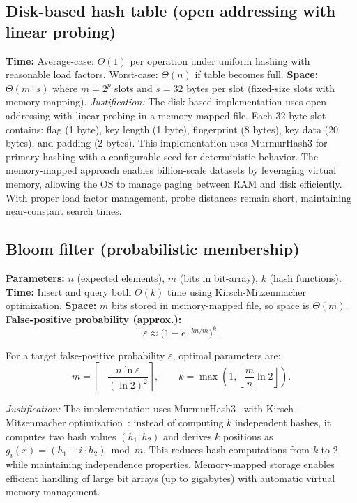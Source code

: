 \documentclass[sigconf]{acmart}
\begin{document}
\subsection{Disk-based hash table (open addressing with linear probing)}
\textbf{Time:} Average-case: $\Theta(1)$ per operation under uniform hashing with reasonable load factors. Worst-case: $\Theta(n)$ if table becomes full.\newline
\textbf{Space:} $\Theta(m \cdot s)$ where $m = 2^p$ slots and $s = 32$ bytes per slot (fixed-size slots with memory mapping).\newline
\textit{Justification:} The disk-based implementation uses open addressing with linear probing in a memory-mapped file. Each 32-byte slot contains: flag (1 byte), key length (1 byte), fingerprint (8 bytes), key data (20 bytes), and padding (2 bytes). This implementation uses MurmurHash3 for primary hashing with a configurable seed for deterministic behavior. The memory-mapped approach enables billion-scale datasets by leveraging virtual memory, allowing the OS to manage paging between RAM and disk efficiently. With proper load factor management, probe distances remain short, maintaining near-constant search times.

\subsection{Bloom filter (probabilistic membership)}
\textbf{Parameters:} $n$ (expected elements), $m$ (bits in bit-array), $k$ (hash functions).\newline
\textbf{Time:} Insert and query both $\Theta(k)$ time using Kirsch-Mitzenmacher optimization.\newline
\textbf{Space:} $m$ bits stored in memory-mapped file, so space is $\Theta(m)$.\newline
\textbf{False-positive probability (approx.):}
\[
\varepsilon \approx \bigl(1 - e^{-kn/m}\bigr)^k.
\]

For a target false-positive probability \(\varepsilon\), optimal parameters are:
\[
m = \left\lceil -\dfrac{n \ln \varepsilon}{(\ln 2)^2} \right\rceil, \qquad
k = \max\left(1, \left\lfloor \dfrac{m}{n}\ln 2 \right\rfloor\right).
\]

\textit{Justification:} The implementation uses MurmurHash3~\cite{mmh3docs} with Kirsch-Mitzenmacher optimization~\cite{kirsch2008}: instead of computing $k$ independent hashes, it computes two hash values $(h_1, h_2)$ and derives $k$ positions as $g_i(x) = (h_1 + i \cdot h_2) \bmod m$. This reduces hash computations from $k$ to 2 while maintaining independence properties. Memory-mapped storage enables efficient handling of large bit arrays (up to gigabytes) with automatic virtual memory management.
\end{document}
